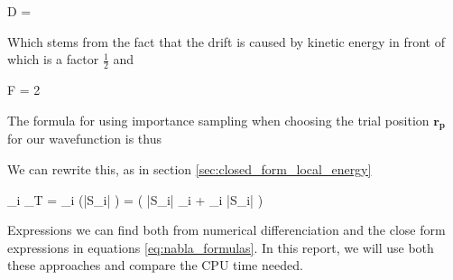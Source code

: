 \eqs
D = 
\eqf 

Which stems from the fact that the drift is caused by kinetic energy in front of which is a factor $\frac{1}{2}$ and 

\eqs
F = 2 
\eqf

The formula for using importance sampling when choosing the trial position $\mathbf{r_p}$ for our wavefunction is thus

\eqs
{}
\eqf

We can rewrite this, as in section \ref{sec:closed_form_local_energy}

\eqs
{} \nabla_i \Psi_T   =  \nabla_i (|S_i| \J)
= \left ( |S_i| \nabla_i \J + \J \nabla_i |S_i|  \right ) 
\eqf
\eqs
{}
\eqf

Expressions we can find both from numerical differenciation and the close form expressions in equations \ref{eq:nabla_formulas}.
In this report, we will use both these approaches and compare the CPU time needed. 

